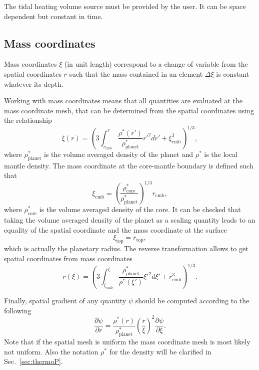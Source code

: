 \documentclass{article}
\begin{document}
The tidal heating volume source must be provided by the user. It can be space dependent but constant in time.

\subsection{Mass coordinates}
\label{sec:mass_coord}

Mass coordinates $\xi$ (in unit length) correspond to a change of variable from the spatial coordinates $r$ such that the mass contained in an element $\Delta \xi$ is constant whatever its depth.

Working with mass coordinates means that all quantities are evaluated at the mass coordinate mesh, that can be determined from the spatial coordinates using the relationship
\begin{equation}
\xi(r) = \left( 3\int^r_{r_\mathrm{cmb}} \frac{\rho^*(r')}{\rho^*_\mathrm{planet}} r'^2dr' +\xi_\mathrm{cmb}^3 \right)^{1/3},
\end{equation}
where $\rho^*_\mathrm{planet}$ is the volume averaged density of the planet and $\rho^*$ is the local mantle density. The mass coordinate at the core-mantle boundary is defined such that
\begin{equation}
\xi_\mathrm{cmb} = \left(\frac{\rho^*_\mathrm{core}}{\rho^*_\mathrm{planet}}\right)^{1/3} r_\mathrm{cmb},
\end{equation}
where $\rho^*_\mathrm{core}$ is the volume averaged density of the core. It can be checked that taking the volume averaged density of the planet as a scaling quantity leads to an equality of the spatial coordinate and the mass coordinate at the surface
\begin{equation}
\xi_\mathrm{top} = r_\mathrm{top},
\end{equation}
which is actually the planetary radius. The reverse transformation allows to get spatial coordinates from mass coordinates
\begin{equation}
   r(\xi) = \left( 3\int^\xi_{\xi_\mathrm{cmb}} \frac{\rho^*_\mathrm{planet}}{\rho^*(\xi')} \xi'^2d\xi' +r_\mathrm{cmb}^3 \right)^{1/3}.
\end{equation}

Finally, spatial gradient of any quantity $\psi$ should be computed according to the following
\begin{equation}
    \frac{\partial \psi}{\partial r} = \frac{\rho^*(r)}{\rho^*_\mathrm{planet}} \left(\frac{r}{\xi}\right)^2 \frac{\partial \psi}{\partial \xi}.
\end{equation}
Note that if the spatial mesh is uniform the mass coordinate mesh is most likely not uniform. Also the notation $\rho^*$ for the density will be clarified in Sec.~\ref{sec:thermoP}.
\end{document}

